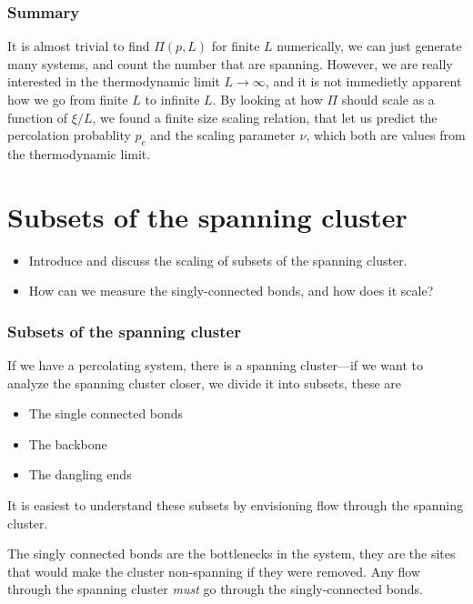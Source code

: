\documentclass[a4paper, 11pt, notitlepage, english]{article}
\begin{document}
\subsubsection*{Summary}

It is almost trivial to find $\Pi(p, L)$ for finite $L$ numerically, we can just generate many systems, and count the number that are spanning. However, we are really interested in the thermodynamic limit $L\to \infty$, and it is not immedietly apparent how we go from finite $L$ to infinite $L$. By looking at how $\Pi$ should scale as a function of $\xi/L$, we found a finite size scaling relation, that let us predict the percolation probablity $p_c$ and the scaling parameter $\nu$, which both are values from the thermodynamic limit.


\clearpage


\section{ Subsets of the spanning cluster}
\begin{itemize}
	\item Introduce and discuss the scaling of subsets of the spanning cluster.
	\item How can we measure the singly-connected bonds, and how does it scale?
\end{itemize}

\subsubsection*{Subsets of the spanning cluster}

If we have a percolating system, there is a spanning cluster---if we want to analyze the spanning cluster closer, we divide it into subsets, these are
\begin{itemize}
	\item The single connected bonds
	\item The backbone
	\item The dangling ends
\end{itemize}

It is easiest to understand these subsets by envisioning flow through the spanning cluster. 

The singly connected bonds are the bottlenecks in the system, they are the sites that would make the cluster non-spanning if they were removed. Any flow through the spanning cluster \emph{must} go through the singly-connected bonds.
\end{document}
